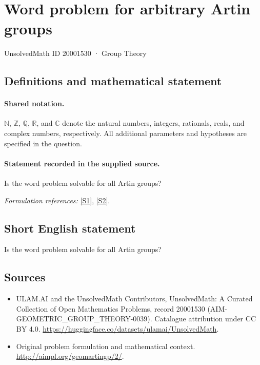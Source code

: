 \documentclass[11pt]{article}
\newcommand{\sref}[2]{\hyperlink{source:#1:#2}{[S#2]}}
\begin{document}
\setcounter{section}{20001529}
\section{Word problem for arbitrary Artin groups}\label{20001530}
{\small UnsolvedMath ID 20001530 · Group Theory}
\subsection{Definitions and mathematical statement}

\paragraph{Shared notation.}$\mathbb N$, $\mathbb Z$, $\mathbb Q$, $\mathbb R$, and $\mathbb C$ denote the natural numbers, integers, rationals, reals, and complex numbers, respectively. All additional parameters and hypotheses are specified in the question.


\paragraph{Statement recorded in the supplied source.}
Is the word problem solvable for all Artin groups?
\par\smallskip\textit{Formulation references:} \sref{20001530}{1}, \sref{20001530}{2}.
\subsection{Short English statement}
Is the word problem solvable for all Artin groups?
\subsection{Sources}
\begin{itemize}
\item[\hypertarget{source:20001530:1}{S1}] ULAM.AI and the UnsolvedMath Contributors, UnsolvedMath: A Curated Collection of Open Mathematics Problems, record 20001530 (AIM-GEOMETRIC\_GROUP\_THEORY-0039). Catalogue attribution under CC BY 4.0.
\url{https://huggingface.co/datasets/ulamai/UnsolvedMath}.
\item[\hypertarget{source:20001530:2}{S2}] Original problem formulation and mathematical context.
\url{http://aimpl.org/geomartingp/2/}.
\end{itemize}
\label{end:20001530}
\end{document}
